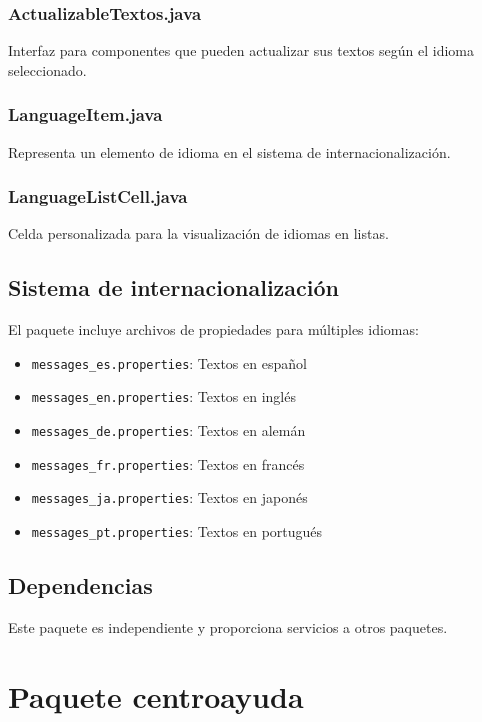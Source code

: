 \subsubsection{ActualizableTextos.java}

Interfaz para componentes que pueden actualizar sus textos según el idioma seleccionado.

\subsubsection{LanguageItem.java}

Representa un elemento de idioma en el sistema de internacionalización.

\subsubsection{LanguageListCell.java}

Celda personalizada para la visualización de idiomas en listas.

\subsection{Sistema de internacionalización}

El paquete incluye archivos de propiedades para múltiples idiomas:

\begin{itemize}
    \item \texttt{messages\_es.properties}: Textos en español
    \item \texttt{messages\_en.properties}: Textos en inglés
    \item \texttt{messages\_de.properties}: Textos en alemán
    \item \texttt{messages\_fr.properties}: Textos en francés
    \item \texttt{messages\_ja.properties}: Textos en japonés
    \item \texttt{messages\_pt.properties}: Textos en portugués
\end{itemize}

\subsection{Dependencias}

Este paquete es independiente y proporciona servicios a otros paquetes.

\section{Paquete centroayuda}

